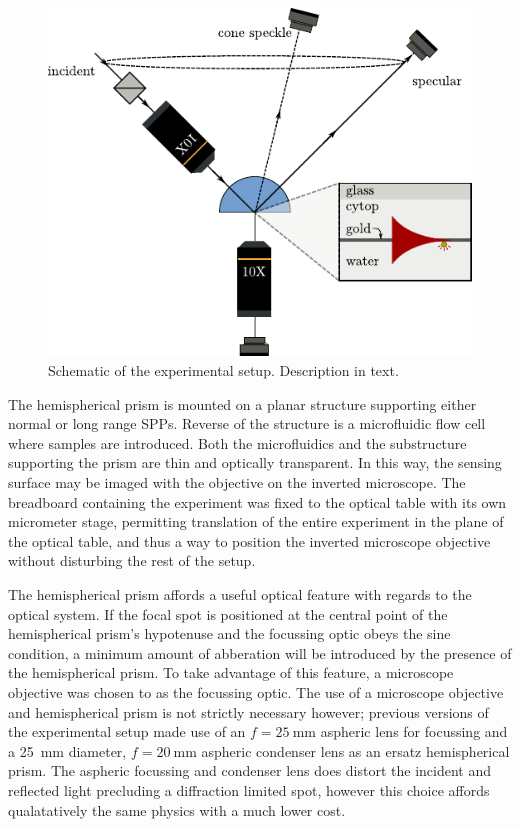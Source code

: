 \begin{figure}[ht]
\centering
 \includegraphics[keepaspectratio]{experimental/figures/conefig.pdf}
 \caption{Schematic of the experimental setup.  Description in text.}
\label{fig:experimentalsetup}
\end{figure}

The hemispherical prism is mounted on a planar structure supporting either
normal or long range SPPs.  Reverse of the structure is a microfluidic flow
cell where samples are introduced.  Both the microfluidics and the
substructure supporting the prism are thin and optically transparent.  In
this way, the sensing surface may be imaged with the objective on the
inverted microscope.  The breadboard containing the experiment was fixed to
the optical table with its own micrometer stage, permitting translation of
the entire experiment in the plane of the optical table, and thus a way to
position the inverted microscope objective without disturbing the rest of
the setup.

The hemispherical prism affords a useful optical feature with regards to
the optical system.  If the focal spot is positioned at the central point
of the hemispherical prism's hypotenuse and the focussing optic obeys the
sine condition, a minimum amount of abberation will be introduced by the
presence of the hemispherical prism.  To take advantage of this feature, a
microscope objective was chosen to as the focussing optic.  The use of a
microscope objective and hemispherical prism is not strictly necessary
however; previous versions of the experimental setup made use of an
$f=\SI{25}{\milli\meter}$ aspheric lens for focussing and a
\SI{25}{\milli\meter} diameter, $f=\SI{20}{\milli\meter}$ aspheric
condenser lens as an ersatz hemispherical prism.  The aspheric focussing
and condenser lens does distort the incident and reflected light precluding
a diffraction limited spot, however this choice affords qualatatively the
same physics with a much lower cost.

